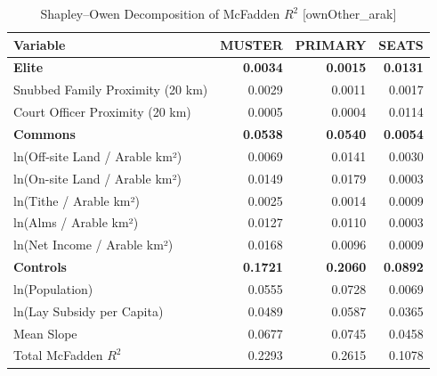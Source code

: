 \begin{table}[H]
\centering
\caption{Shapley--Owen Decomposition of McFadden $R^2$ [ownOther_arak]}
\label{tab:shapley_owen_ownOther_arak}
\begin{tabular}{lrrr}
\hline\hline
Variable & MUSTER & PRIMARY & SEATS \\
\hline
\textbf{Elite} & \textbf{0.0034} & \textbf{0.0015} & \textbf{0.0131} \\
\quad Snubbed Family Proximity (20 km) & 0.0029 & 0.0011 & 0.0017 \\
\quad Court Officer Proximity (20 km) & 0.0005 & 0.0004 & 0.0114 \\
\textbf{Commons} & \textbf{0.0538} & \textbf{0.0540} & \textbf{0.0054} \\
\quad ln(Off-site Land / Arable km²) & 0.0069 & 0.0141 & 0.0030 \\
\quad ln(On-site Land / Arable km²) & 0.0149 & 0.0179 & 0.0003 \\
\quad ln(Tithe / Arable km²) & 0.0025 & 0.0014 & 0.0009 \\
\quad ln(Alms / Arable km²) & 0.0127 & 0.0110 & 0.0003 \\
\quad ln(Net Income / Arable km²) & 0.0168 & 0.0096 & 0.0009 \\
\textbf{Controls} & \textbf{0.1721} & \textbf{0.2060} & \textbf{0.0892} \\
\quad ln(Population) & 0.0555 & 0.0728 & 0.0069 \\
\quad ln(Lay Subsidy per Capita) & 0.0489 & 0.0587 & 0.0365 \\
\quad Mean Slope & 0.0677 & 0.0745 & 0.0458 \\
\hline
Total McFadden $R^2$ & 0.2293 & 0.2615 & 0.1078 \\
\hline\hline
\end{tabular}
\end{table}
